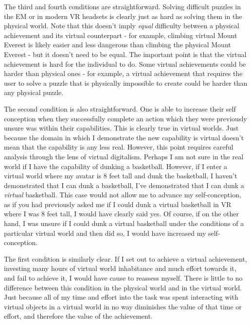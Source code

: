The third and fourth conditions are straightforward. Solving difficult puzzles
in the EM or in modern VR headsets is clearly just as hard as solving them in 
the physical world. Note that this doesn't imply \emph{equal} difficulty between
a physical achievement and its virtual counterpart - for example, climbing
virtual Mount Everest is likely easier and less dangerous than climbing the 
physical Mount Everest - but it doesn't need to be equal. The important point is
that the virtual achievement is hard for the individual to do. Some virtual 
achievements could be harder than physical ones - for example, a virtual
achievement that requires the user to solve a puzzle that is physically
impossible to create could be harder than any physical puzzle.

The second condition is also straightforward. One is able to increase their self
conception when they successfully complete an action which they were previously 
unsure was within their capabilities. This is clearly true in virtual worlds. 
Just because the domain in which I demonstrate the new capability is virtual
doesn't mean that the capability is any less real. However, this point requires
careful analysis through the lens of virtual digitalism. Perhaps I am not sure
in the real world if I have the capability of dunking a basketball. However, if 
I enter a virtual world where my avatar is 8 feet tall and dunk the basketball,
I haven't demonstrated that I can dunk a basketball, I've demonstrated that I
can dunk a \emph{virtual} basketball. This case would not allow me to advance my 
self-conception, as if you had previously asked me if I could dunk a virtual 
basketball in VR where I was 8 feet tall, I would have clearly said yes. Of
course, if on the other hand, I was unsure if I could dunk a virtual basketball
under the conditions of a particular virtual world and then did so, I would have
increased my self-conception. 

The first condition is similarly clear. If I set out to achieve a virtual
achievement, investing many hours of virtual world inhabitance and much effort 
towards it, and fail to achieve it, I would have cause to reassess myself. There
is little to no difference between this condition in the physical world and in
the virtual world. Just because all of my time and effort into the task was
spent interacting with virtual objects in a virtual world in no way diminishes 
the value of that time or effort, and therefore the value of the achievement.

